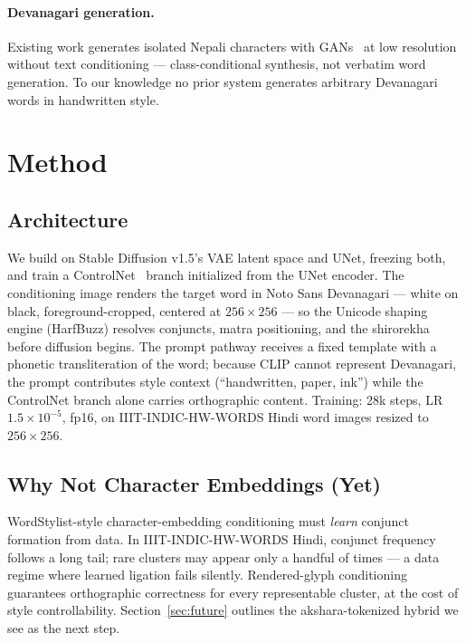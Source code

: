 \documentclass{llncs}
\begin{document}
\paragraph{Devanagari generation.}
Existing work generates isolated Nepali characters with
GANs~\cite{nepaligan2022} at low resolution without text conditioning —
class-conditional synthesis, not verbatim word generation. To our knowledge
no prior system generates arbitrary Devanagari words in handwritten style.

\section{Method}

\subsection{Architecture}

We build on Stable Diffusion v1.5's VAE latent space and UNet, freezing
both, and train a ControlNet~\cite{zhang2023controlnet} branch initialized
from the UNet encoder. The conditioning image renders the target word in
Noto Sans Devanagari — white on black, foreground-cropped, centered at
$256{\times}256$ — so the Unicode shaping engine (HarfBuzz) resolves
conjuncts, matra positioning, and the shirorekha before diffusion begins.
The prompt pathway receives a fixed template with a phonetic
transliteration of the word; because CLIP cannot represent Devanagari, the
prompt contributes style context (``handwritten, paper, ink'') while the
ControlNet branch alone carries orthographic content. Training: 28k steps,
LR $1.5{\times}10^{-5}$, fp16, on IIIT-INDIC-HW-WORDS Hindi word images
resized to $256{\times}256$.

\subsection{Why Not Character Embeddings (Yet)}

WordStylist-style character-embedding conditioning must \emph{learn}
conjunct formation from data. In IIIT-INDIC-HW-WORDS Hindi, conjunct
frequency follows a long tail; rare clusters may appear only a handful of
times — a data regime where learned ligation fails silently. Rendered-glyph
conditioning guarantees orthographic correctness for every representable
cluster, at the cost of style controllability. Section~\ref{sec:future}
outlines the akshara-tokenized hybrid we see as the next step.
\end{document}
